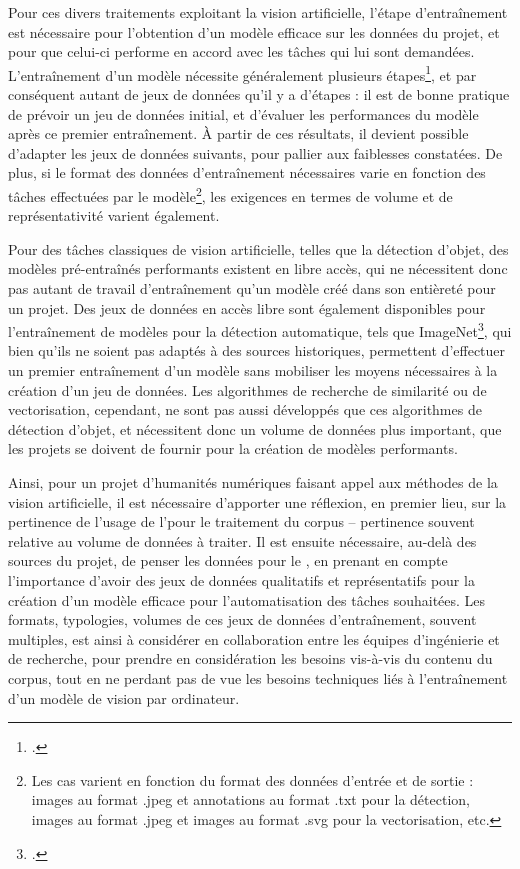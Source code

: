 Pour ces divers traitements exploitant la vision artificielle, l'étape d'entraînement est nécessaire pour l'obtention d'un modèle efficace sur les données du projet, et pour que celui-ci performe en accord avec les tâches qui lui sont demandées. L'entraînement d'un modèle nécessite généralement plusieurs étapes\footcite{strienComputerVisionHumanities2022}, et par conséquent autant de jeux de données qu'il y a d'étapes : il est de bonne pratique de prévoir un jeu de données initial, et d'évaluer les performances du modèle après ce premier entraînement. À partir de ces résultats, il devient possible d'adapter les jeux de données suivants, pour pallier aux faiblesses constatées. De plus, si le format des données d'entraînement nécessaires varie en fonction des tâches effectuées par le modèle\footnote{Les cas varient en fonction du format des données d'entrée et de sortie : images au format .jpeg et annotations au format .txt pour la détection, images au format .jpeg et images au format .svg pour la vectorisation, etc.}, les exigences en termes de volume et de représentativité varient également. 

Pour des tâches classiques de vision artificielle, telles que la détection d'objet, des modèles pré-entraînés performants existent en libre accès, qui ne nécessitent donc pas autant de travail d'entraînement qu'un modèle créé dans son entièreté pour un projet. Des jeux de données en accès libre sont également disponibles pour l'entraînement de modèles pour la détection automatique, tels que ImageNet\footcite{ImageNet}, qui bien qu'ils ne soient pas adaptés à des sources historiques, permettent d'effectuer un premier entraînement d'un modèle sans mobiliser les moyens nécessaires à la création d'un jeu de données. Les algorithmes de recherche de similarité ou de vectorisation, cependant, ne sont pas aussi développés que ces algorithmes de détection d'objet, et nécessitent donc un volume de données plus important, que les projets se doivent de fournir pour la création de modèles performants.

Ainsi, pour un projet d'humanités numériques faisant appel aux méthodes de la vision artificielle, il est nécessaire d'apporter une réflexion, en premier lieu, sur la pertinence de l'usage de l'\ia pour le traitement du corpus -- pertinence souvent relative au volume de données à traiter. Il est ensuite nécessaire, au-delà des sources du projet, de penser les données pour le \dl, en prenant en compte l'importance d'avoir des jeux de données qualitatifs et représentatifs pour la création d'un modèle efficace pour l'automatisation des tâches souhaitées. Les formats, typologies, volumes de ces jeux de données d'entraînement, souvent multiples, est ainsi à considérer en collaboration entre les équipes d'ingénierie et de recherche, pour prendre en considération les besoins vis-à-vis du contenu du corpus, tout en ne perdant pas de vue les besoins techniques liés à l'entraînement d'un modèle de vision par ordinateur.
